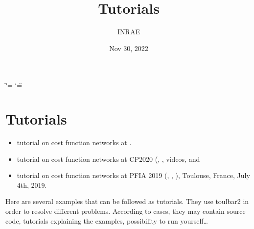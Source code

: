 \documentclass[letterpaper,10pt,openany,oneside,english]{sphinxmanual}
\title{Tutorials}
\date{Nov 30, 2022}
\author{INRAE}
\begin{document}
\ifdefined\shorthandoff
  \ifnum\catcode`\=\string=\active\shorthandoff{=}\fi
  \ifnum\catcode`\"=\active{}\fi
\fi

\pagestyle{empty}
\sphinxmaketitle
\pagestyle{plain}
\sphinxtableofcontents
\pagestyle{normal}
\label{\detokenize{examples/tutorials_pdf::doc}}



\chapter{Tutorials}
\label{\detokenize{examples/tutorials_pdf:id1}}\label{\detokenize{examples/tutorials_pdf:id2}}\begin{itemize}
\item {} 
\sphinxAtStartPar
tutorial  on
cost function networks at .

\item {} 
\sphinxAtStartPar
tutorial on cost function networks at CP2020 (, ,  videos, and 

\item {} 
\sphinxAtStartPar
tutorial on cost function networks at PFIA 2019 (, , ), Toulouse, France, July 4th, 2019.

\end{itemize}

\sphinxAtStartPar
Here are several examples that can be followed as tutorials.
They use toulbar2 in order to resolve different problems.
According to cases, they may contain source code, tutorials explaining the examples, possibility to run yourself…
\end{document}
